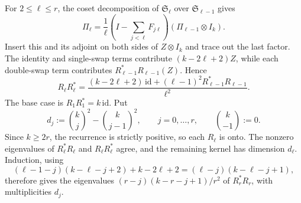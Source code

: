 For $2\leq\ell\leq r$, the coset decomposition of $\mathfrak S_\ell$
over $\mathfrak S_{\ell-1}$ gives
\begin{equation}
    \Pi_\ell=\frac1\ell\left(I-\sum_{j<\ell}F_{j\ell}\right)
        (\Pi_{\ell-1}\otimes I_k).
\end{equation}
Insert this and its adjoint on both sides of $Z\otimes I_k$ and trace
out the last factor. The identity and single-swap terms contribute
$(k-2\ell+2)Z$, while each double-swap term contributes
$R_{\ell-1}^*R_{\ell-1}(Z)$. Hence
\begin{equation}
    R_\ell R_\ell^*
    =\frac{(k-2\ell+2)\,\mathrm{id}
        +(\ell-1)^2R_{\ell-1}^*R_{\ell-1}}{\ell^2}.
\end{equation}
The base case is $R_1R_1^*=k\,\mathrm{id}$. Put
\begin{equation}
    d_j:=\binom kj^2-\binom k{j-1}^2,
    \qquad j=0,\ldots,r,\qquad \binom k{-1}:=0.
\end{equation}
Since $k\geq2r$, the recurrence is strictly positive, so each $R_\ell$
is onto. The nonzero eigenvalues of $R_\ell^*R_\ell$ and
$R_\ell R_\ell^*$ agree, and the remaining kernel has dimension $d_\ell$.
Induction, using
\begin{equation}
    (\ell-1-j)(k-\ell-j+2)+k-2\ell+2
    =(\ell-j)(k-\ell-j+1),
\end{equation}
therefore gives the eigenvalues
$(r-j)(k-r-j+1)/r^2$ of $R_r^*R_r$, with multiplicities $d_j$.
